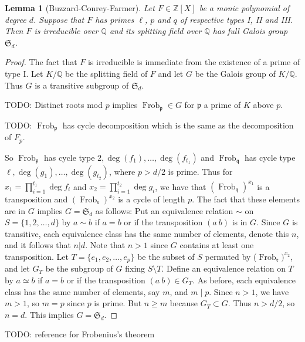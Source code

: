 \documentclass[11pt]{article}
\theoremstyle{plain}
\newtheorem{lemma}[theorem]{Lemma}
\theoremstyle{definition}
\theoremstyle{remark}
\numberwithin{equation}{section}
\numberwithin{table}{section}
\newcommand{\ZZ}{\mathbb{Z}}
\newcommand{\QQ}{\mathbb{Q}}
\renewcommand{\SS}{\mathfrak{S}}
\newcommand{\Frob}{\operatorname{Frob}}
\begin{document}
\begin{lemma}[Buzzard-Conrey-Farmer]
  Let $F\in\ZZ[X]$ be a monic polynomial of degree $d$.  Suppose that $F$ has
  primes $\ell$, $p$ and $q$ of respective types I, II and III.  Then $F$
  is irreducible over $\QQ$ and its splitting field over $\QQ$ has full Galois
  group $\SS_d$.
\end{lemma}
\begin{proof}
  The fact that $F$ is irreducible is immediate from the existence of a prime of type
  I. 
  Let $K/\QQ$ be the splitting field of $F$ and let $G$ be the Galois group of
  $K/\QQ$.  Thus $G$ is a transitive subgroup of $\SS_d$. 

  TODO: Distinct roots mod $p$ implies $\Frob_{\mathfrak{p}} \in G$ for
  $\mathfrak{p}$
  a prime of $K$ above $p$.

  TODO: $\Frob_{\mathfrak{p}}$ has cycle decomposition which is the same as the
  decomposition of $F_p$.

  So $\Frob_{\mathfrak{p}}$ has cycle type $2,\deg(f_1),\ldots,\deg(f_{t_1})$ and
  $\Frob_{\mathfrak{q}}$ has cycle type $\ell,\deg(g_1),\ldots,\deg(g_{t_2})$, where 
  $p>d/2$ is prime. Thus for $x_1=\prod_{i=1}^{t_1}\deg f_i$ and $x_2=\prod_{i=1}^{t_2}\deg g_i$,
  we have that $(\Frob_{\mathfrak{q}})^{x_1}$ is a transposition and 
  $(\Frob_{\mathfrak{r}})^{x_2}$
  is a cycle of length $p$. The fact that these elements are in $G$ implies $G=\SS_d$ as follows:
  Put an equivalence relation $\sim$ on $S=\{1,2,\ldots,d\}$ by $a\sim b$ if $a=b$ or if the
  transposition $(a~b)$ is in $G$. Since $G$ is
  transitive, each equivalence class has the same number of elements, denote this
  $n$, and it follows that $n|d$. Note that $n>1$ since $G$ contains at least one
  transposition. Let $T=\{e_1,e_2,\ldots,e_p\}$ be the subset of $S$ permuted by
  ($\Frob_{\mathfrak{r}})^{x_2}$, and let $G_T$ be the subgroup of $G$ fixing $S\setminus T$.
  Define an equivalence relation on $T$ by $a\simeq b$ if $a=b$ or if the transposition
  $(a~b) \in G_T$. As before, each equivalence class has the same number of elements,
  say $m$, and $m\mid p$. Since $n>1$, we have $m>1$, so $m=p$ since $p$ is prime.
  But $n\geq m$ because $G_T\subset G$. Thus $n>d/2$, so $n=d$. This implies $G=\SS_d$. 
\end{proof}

TODO: reference for Frobenius's theorem
\end{document}
